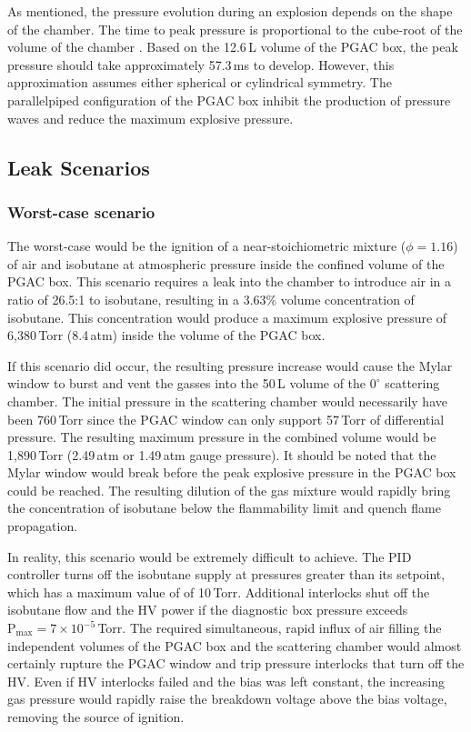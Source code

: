 As mentioned, the pressure evolution during an explosion depends on the shape of the chamber.  The time to peak pressure is proportional to the cube-root of the volume of the chamber \cite{Zabetakis_1965}. Based on the 12.6\,L volume of the PGAC box, the peak pressure should take approximately 57.3\,ms to develop.  However, this approximation assumes either spherical or cylindrical symmetry.  The parallelpiped configuration of the PGAC box inhibit the production of pressure waves and reduce the maximum explosive pressure.


\subsection{Leak Scenarios}
\subsubsection{Worst-case scenario}
The worst-case would be the ignition of a near-stoichiometric mixture ($\phi=1.16$) of air and isobutane at atmospheric pressure  inside the confined volume  of the PGAC box. %
This scenario requires a leak into the chamber to introduce air in a ratio of 26.5:1 to isobutane, resulting in a 3.63\% volume concentration of isobutane.  This concentration would produce a maximum explosive pressure of 6,380\,Torr (8.4\,atm) %
inside the volume of the PGAC box.

If this scenario did occur, the resulting pressure increase would cause %
the Mylar window to burst 
and vent the gasses into the 50\,L volume of the $0^{\circ}$ scattering chamber. The initial pressure in the scattering chamber would necessarily have been 760\,Torr %
since the PGAC window can only support 57\,Torr of %
 differential pressure. The resulting maximum pressure in the combined volume would be
 1,890\,Torr (2.49\,atm or 1.49\,atm gauge pressure).
 It should be noted that the Mylar window would break before the peak explosive pressure in the PGAC box could be reached.  The resulting dilution of the gas mixture would rapidly bring the concentration of isobutane below the flammability limit and quench flame propagation.

In reality, this scenario would be extremely difficult to achieve. The PID controller turns off the isobutane supply at pressures greater than its setpoint, which has a maximum value of of 10\,Torr.  Additional interlocks shut off the isobutane flow and the HV power if the diagnostic box pressure exceeds $\textrm{P}_\textrm{max}=7\times10^{-5}$\,Torr.  The required simultaneous, rapid influx of air filling the independent volumes of the PGAC box and the scattering chamber would almost certainly rupture the PGAC window and trip pressure interlocks that turn off the HV.  Even if HV interlocks failed and the bias was left constant, the increasing gas pressure would rapidly raise the breakdown voltage above the bias voltage, removing the source of ignition. %


